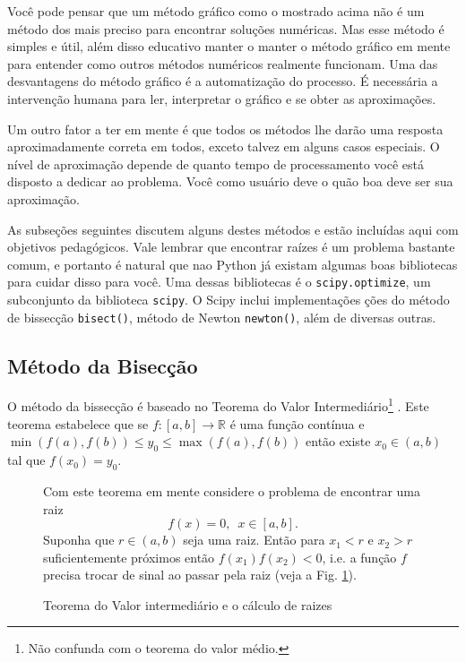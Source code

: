 Você pode pensar que um método gráfico como o mostrado acima não é um método
dos mais preciso para encontrar soluções numéricas. Mas esse método é simples e útil, além disso educativo manter o manter o método gráfico em mente para entender como outros métodos numéricos realmente funcionam. Uma das desvantagens do método gráfico é a automatização do processo. É necessária a intervenção humana para ler, interpretar o gráfico e se obter as aproximações.

Um outro fator a ter em mente é que todos os métodos lhe darão uma resposta aproximadamente correta em todos, exceto talvez em alguns casos especiais. O nível de aproximação depende de quanto tempo de processamento você está disposto a dedicar ao problema. Você como usuário deve o quão boa deve ser sua aproximação.

As subseções seguintes discutem alguns destes métodos e estão incluídas aqui com objetivos pedagógicos. Vale lembrar que  encontrar raízes é um problema bastante comum, e portanto é natural que nao Python já existam algumas boas bibliotecas para cuidar disso para você. Uma dessas bibliotecas é o {\tt  scipy.optimize},
um subconjunto da biblioteca {\tt scipy}. O Scipy inclui implementações
ções do método de bissecção {\tt bisect()}, método de Newton {\tt newton()}, além de diversas outras.

\subsection{Método da Bisecção}

O método da bissecção é  baseado no Teorema do Valor Intermediário\footnote{Não confunda com o teorema do valor médio.} \cite{lima2004curso}. Este teorema estabelece que se $f : [a, b] \to \mathbb{R}$ é uma função contínua e $\min(f(a), f(b)) \leqslant y_0 \leqslant \max(f(a),f(b))$ então existe $x_0 \in (a,b)$ tal que $f(x_0)=y_0$. 

\begin{figure}[!h]
\begin{minipage}{0.45\linewidth}
Com este teorema em mente considere o problema de encontrar uma raiz 
\[f(x) = 0,\,\,\, x \in [a,b].\]
Suponha que $r \in (a,b)$ seja uma raiz. Então para $x_1<r$ e $x_2>r$ suficientemente próximos então $f(x_1)f(x_2)<0$, i.e. a função $f$ precisa trocar de sinal ao passar pela raiz (veja a Fig. \ref{fig:intermediario}).
\end{minipage}
\hspace{0.05\linewidth}
\begin{minipage}{0.45\linewidth}
\centering

\caption{Teorema do Valor intermediário e o cálculo de raizes} \label{fig:intermediario}
\end{minipage}
\end{figure}

